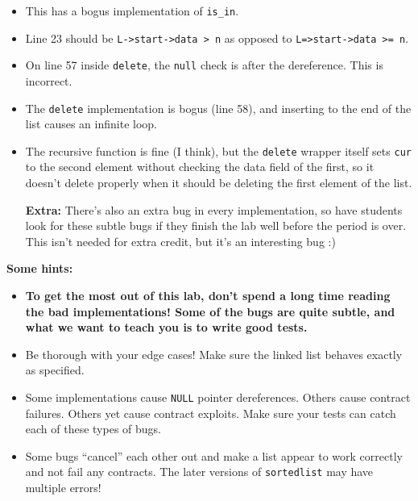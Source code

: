 \begin{solution}
\begin{itemize}
\item%
  This has a bogus implementation of \lstinline'is_in'.
\item%
  Line 23 should be \lstinline'L->start->data > n' as opposed to
  \lstinline'L=>start->data >= n'.
\item%
  On line 57 inside \lstinline'delete', the \lstinline'null' check is
  after the dereference. This is incorrect.
\item%
  The \lstinline'delete' implementation is bogus (line 58), and
  inserting to the end of the list causes an infinite loop.
\item%
  The recursive function is fine (I think), but the \lstinline'delete'
  wrapper itself sets \lstinline'cur' to the second element without
  checking the data field of the first, so it doesn't delete properly
  when it should be deleting the first element of the list.
\item[\bf Extra:]%
  There's also an extra bug in every implementation, so have students
  look for these subtle bugs if they finish the lab well before the
  period is over. This isn't needed for extra credit, but it's an
  interesting bug :)
\end{itemize}
\end{solution}

\enlargethispage{5ex}
\textbf{Some hints:}
\begin{itemize}
\itemsep=0pt
\vspace{-2ex}
\item%
  \textbf{To get the most out of this lab, don't spend a long time reading the
  bad implementations! Some of the bugs are quite subtle, and what we
  want to teach you is to write good tests.}
\item%
  Be thorough with your edge cases! Make
  sure the linked list behaves exactly as specified.
\item%
  Some implementations cause \lstinline'NULL' pointer dereferences.
  Others cause contract failures.  Others yet cause contract
  exploits. Make sure your tests can catch each of these types of bugs.
\item%
  Some bugs ``cancel'' each other out and make a list appear to work
  correctly and not fail any contracts.  The later versions of
  \lstinline'sortedlist' may have multiple errors!
\end{itemize}
